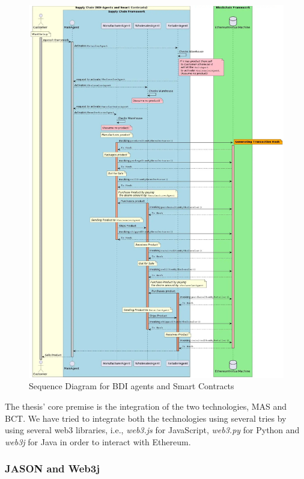  \begin{figure}[h!]
\centering
  \includegraphics[width=15cm]{includes/figures/sqdgm.jpg} 
  \caption{Sequence Diagram for \ac{BDI} agents and Smart Contracts}
  \label{Sequence Diagram for BDI agents and Smart Contracts}
\end{figure}

 \vspace{.5cm}

The thesis' core premise is the integration of the two technologies, \ac{MAS} and \ac{BCT}. We have tried to integrate both the technologies using several tries by using several web3 libraries, i.e., \textit{web3.js} for JavaScript, \textit{web3.py} for Python and \textit{web3j} for Java in order to interact with Ethereum.

\subsubsection{JASON and Web3j}

